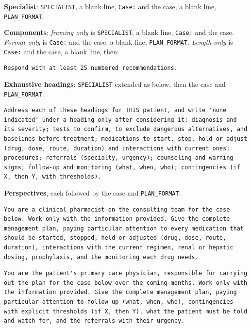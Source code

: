 \documentclass[11pt]{article}
\begin{document}
\textbf{Specialist}: \texttt{SPECIALIST}, a blank line, \texttt{Case:} and the case, a blank line,
\texttt{PLAN\_FORMAT}.

\textbf{Components}: \emph{framing only} is \texttt{SPECIALIST}, a blank line, \texttt{Case:} and
the case. \emph{Format only} is \texttt{Case:} and the case, a blank line, \texttt{PLAN\_FORMAT}.
\emph{Length only} is \texttt{Case:} and the case, a blank line, then:
\begin{lstlisting}
Respond with at least 25 numbered recommendations.
\end{lstlisting}

\textbf{Exhaustive headings}: \texttt{SPECIALIST} extended as below, then the case and
\texttt{PLAN\_FORMAT}:
\begin{lstlisting}
Address each of these headings for THIS patient, and write 'none indicated' under a heading only after considering it: diagnosis and its severity; tests to confirm, to exclude dangerous alternatives, and baselines before treatment; medications to start, stop, hold or adjust (drug, dose, route, duration) and interactions with current ones; procedures; referrals (specialty, urgency); counseling and warning signs; follow-up and monitoring (what, when, who); contingencies (if X, then Y, with thresholds).
\end{lstlisting}

\textbf{Perspectives}, each followed by the case and \texttt{PLAN\_FORMAT}:
\begin{lstlisting}
You are a clinical pharmacist on the consulting team for the case below. Work only with the information provided. Give the complete management plan, paying particular attention to every medication that should be started, stopped, held or adjusted (drug, dose, route, duration), interactions with the current regimen, renal or hepatic dosing, prophylaxis, and the monitoring each drug needs.
\end{lstlisting}
\begin{lstlisting}
You are the patient's primary care physician, responsible for carrying out the plan for the case below over the coming months. Work only with the information provided. Give the complete management plan, paying particular attention to follow-up (what, when, who), contingencies with explicit thresholds (if X, then Y), what the patient must be told and watch for, and the referrals with their urgency.
\end{lstlisting}
\end{document}
